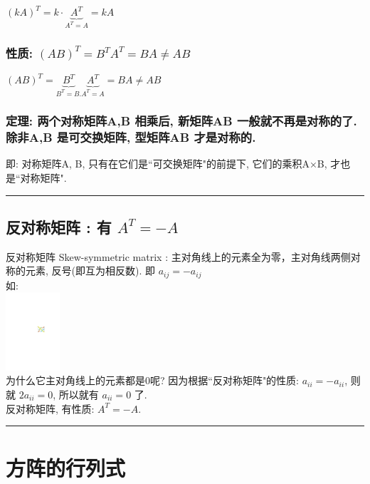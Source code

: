 \documentclass[UTF8]{ctexart}
\begin{document}
$
\left( kA \right) ^T=k\cdot \underset{A^T=A}{\underbrace{A^T}}=kA
$


\subsubsection{性质: $\left( AB \right) ^T=B^TA^T=BA\ne AB$ }

$
\left( AB \right) ^T=\underset{B^T=B.}{\underbrace{B^T}}\underset{A^T=A}{\underbrace{A^T}}=BA\ne AB
$


\subsubsection{定理: 两个对称矩阵A,B 相乘后, 新矩阵AB 一般就不再是对称的了. 除非A,B 是可交换矩阵, 型矩阵AB 才是对称的.}

即: 对称矩阵A, B, 只有在它们是``可交换矩阵"的前提下, 它们的乘积A×B, 才也是``对称矩阵". \\


\hrule


\subsection{反对称矩阵 : 有 $A^T = - A$}

反对称矩阵 Skew-symmetric matrix : 主对角线上的元素全为零，主对角线两侧对称的元素, 反号(即互为相反数). 即 $a_{ij}= -a_{ij}$ \\

如: \\
\includegraphics[width=0.15\textwidth]{img/0023.pdf} \\

为什么它主对角线上的元素都是0呢? 因为根据``反对称矩阵"的性质: $a_{ii}= -a_{ii}$, 则就 $2a_{ii}=0$, 所以就有 $a_{ii}=0$ 了. \\

反对称矩阵, 有性质: $A^T = - A$.\\


\hrule




\section{方阵的行列式}
\end{document}
